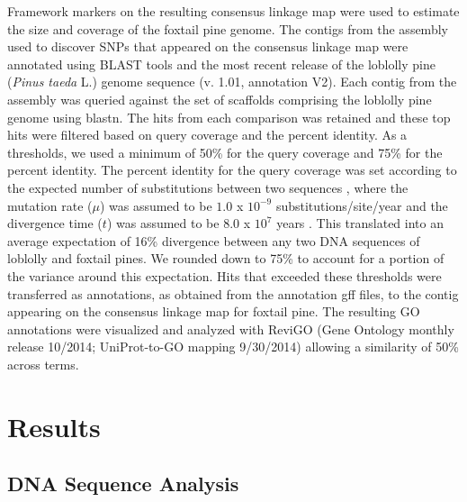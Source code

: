 \documentclass[smallextended]{svjour3}
\begin{document}
Framework markers on the resulting consensus linkage map were used to estimate
the size \citep{Chakravarti:1991} and coverage \citep{Lange:1982} of the foxtail
pine genome. The contigs from the assembly used to discover SNPs that appeared
on the consensus linkage map were annotated using BLAST tools
\citep{Altschul:1990vt} and the most recent release of the loblolly pine
(\textit{Pinus taeda} L.) genome sequence (v. 1.01, annotation V2). Each contig
from the assembly was queried against the set of scaffolds comprising the
loblolly pine genome using blastn. The hits from each comparison was retained
and these top hits were filtered based on query coverage and the percent
identity. As a thresholds, we used a minimum of 50\% for the query coverage and
75\% for the percent identity. The percent identity for the query coverage was
set according to the expected number of substitutions between two sequences
\citep[$2 \mu t$, see][]{Nei:1987}, where the mutation rate ($\mu$) was assumed
to be $1.0$ x $10^{-9}$ substitutions/site/year and the divergence time ($t$)
was assumed to be $8.0$ x $10^{7}$ years \citep{Willyard:2007}.  This translated
into an average expectation of 16\% divergence between any two DNA sequences of
loblolly and foxtail pines. We rounded down to 75\% to account for a portion of
the variance around this expectation. Hits that exceeded these thresholds were
transferred as annotations, as obtained from the annotation gff files, to the
contig appearing on the consensus linkage map for foxtail pine. The resulting GO
annotations were visualized and analyzed with ReviGO (Gene Ontology monthly
release 10/2014; UniProt-to-GO mapping 9/30/2014) \citep{Supek:2011bw} allowing
a similarity of 50\% across terms.

\section*{Results}

\subsection*{DNA Sequence Analysis}
\end{document}
